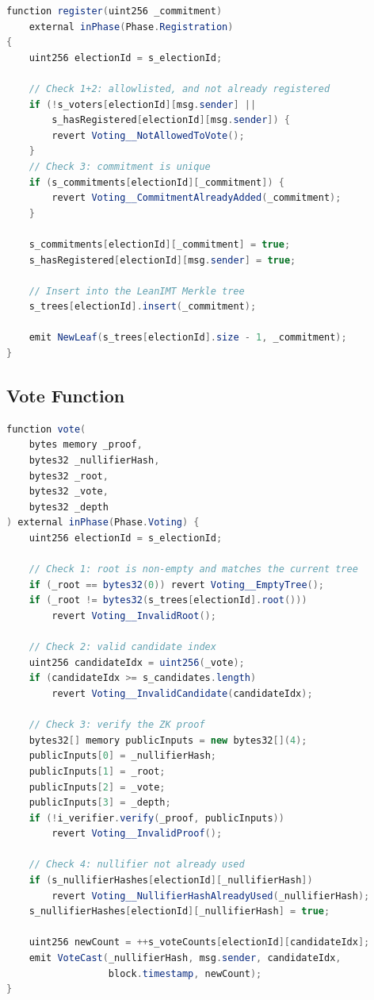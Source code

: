 \begin{lstlisting}[language=Java, caption={Voter registration: commitment insertion into the Merkle tree.}]
function register(uint256 _commitment)
    external inPhase(Phase.Registration)
{
    uint256 electionId = s_electionId;

    // Check 1+2: allowlisted, and not already registered
    if (!s_voters[electionId][msg.sender] ||
        s_hasRegistered[electionId][msg.sender]) {
        revert Voting__NotAllowedToVote();
    }
    // Check 3: commitment is unique
    if (s_commitments[electionId][_commitment]) {
        revert Voting__CommitmentAlreadyAdded(_commitment);
    }

    s_commitments[electionId][_commitment] = true;
    s_hasRegistered[electionId][msg.sender] = true;

    // Insert into the LeanIMT Merkle tree
    s_trees[electionId].insert(_commitment);

    emit NewLeaf(s_trees[electionId].size - 1, _commitment);
}
\end{lstlisting}

\subsection{Vote Function}

\begin{lstlisting}[language=Java, caption={Anonymous vote casting with ZK proof verification.}]
function vote(
    bytes memory _proof,
    bytes32 _nullifierHash,
    bytes32 _root,
    bytes32 _vote,
    bytes32 _depth
) external inPhase(Phase.Voting) {
    uint256 electionId = s_electionId;

    // Check 1: root is non-empty and matches the current tree
    if (_root == bytes32(0)) revert Voting__EmptyTree();
    if (_root != bytes32(s_trees[electionId].root()))
        revert Voting__InvalidRoot();

    // Check 2: valid candidate index
    uint256 candidateIdx = uint256(_vote);
    if (candidateIdx >= s_candidates.length)
        revert Voting__InvalidCandidate(candidateIdx);

    // Check 3: verify the ZK proof
    bytes32[] memory publicInputs = new bytes32[](4);
    publicInputs[0] = _nullifierHash;
    publicInputs[1] = _root;
    publicInputs[2] = _vote;
    publicInputs[3] = _depth;
    if (!i_verifier.verify(_proof, publicInputs))
        revert Voting__InvalidProof();

    // Check 4: nullifier not already used
    if (s_nullifierHashes[electionId][_nullifierHash])
        revert Voting__NullifierHashAlreadyUsed(_nullifierHash);
    s_nullifierHashes[electionId][_nullifierHash] = true;

    uint256 newCount = ++s_voteCounts[electionId][candidateIdx];
    emit VoteCast(_nullifierHash, msg.sender, candidateIdx,
                  block.timestamp, newCount);
}
\end{lstlisting}

